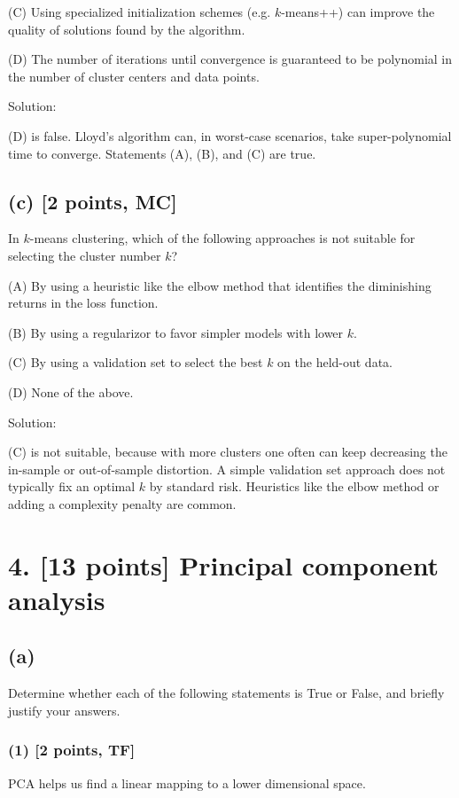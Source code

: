 \documentclass[twocolumn]{article}
\begin{document}
\begin{spacing}{1}
(C) Using specialized initialization schemes (e.g. \(k\)-means++) can improve the quality of solutions found by the algorithm.

(D) The number of iterations until convergence is guaranteed to be polynomial in the number of cluster centers and data points.

Solution:

(D) is false. Lloyd's algorithm can, in worst-case scenarios, take super-polynomial time to converge. Statements (A), (B), and (C) are true.

\subsection*{(c) [2 points, MC]}
In \(k\)-means clustering, which of the following approaches is not suitable for selecting the cluster number \(k\)?

(A) By using a heuristic like the elbow method that identifies the diminishing returns in the loss function.

(B) By using a regularizor to favor simpler models with lower \(k\).

(C) By using a validation set to select the best \(k\) on the held-out data.

(D) None of the above.

Solution:

(C) is not suitable, because with more clusters one often can keep decreasing the in-sample or out-of-sample distortion. A simple validation set approach does not typically fix an optimal \(k\) by standard risk. Heuristics like the elbow method or adding a complexity penalty are common.

\bigskip

\section{4. [13 points] Principal component analysis}

\subsection*{(a)}
Determine whether each of the following statements is True or False, and briefly justify your answers.

\subsubsection*{(1) [2 points, TF]}
PCA helps us find a linear mapping to a lower dimensional space.


\end{spacing}
\end{document}
